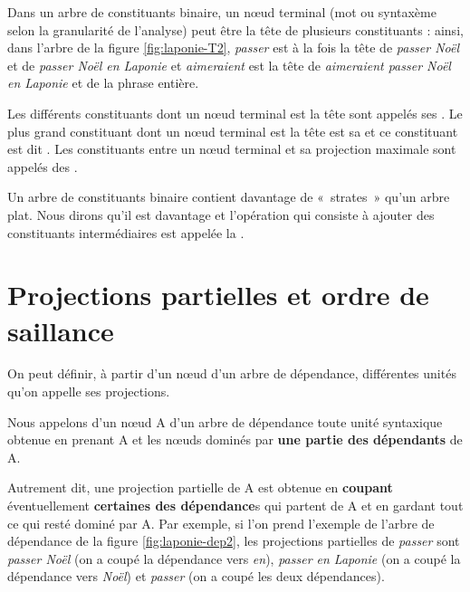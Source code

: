 Dans un arbre de constituants binaire, un nœud terminal (mot ou syntaxème selon la granularité de l’analyse) peut être la tête de plusieurs constituants : ainsi, dans l'arbre de la figure \ref{fig:laponie-T2}, \textit{passer} est à la fois la tête de \textit{passer Noël} et de \textit{passer Noël en Laponie} et \textit{aimeraient} est la tête de \textit{aimeraient passer Noël en Laponie} et de la phrase entière. 

{Les différents constituants dont un nœud terminal est la tête sont appelés ses . Le plus grand constituant dont un nœud terminal est la tête est sa  et ce constituant est dit . Les constituants entre un nœud terminal et sa projection maximale sont appelés des .}

{Un arbre de constituants binaire contient davantage de «~strates~» qu’un arbre plat. Nous dirons qu’il est davantage  et l’opération qui consiste à ajouter des constituants intermédiaires est appelée la .}

\section{Projections partielles et ordre de saillance}\label{sec:3.4.15}

On peut définir, à partir d'un nœud d'un arbre de dépendance, différentes unités qu'on appelle ses projections. 

{Nous appelons  d’un nœud A d'un arbre de dépendance toute unité syntaxique obtenue en prenant A et les nœuds dominés par \textbf{une partie des dépendants} de A.}

Autrement dit, une projection partielle de A est obtenue en \textbf{coupant} éventuellement \textbf{certaines des dépendance}s qui partent de A et en gardant tout ce qui resté dominé par A. Par exemple, si l'on prend l'exemple de l'arbre de dépendance de la figure \ref{fig:laponie-dep2}, les projections partielles de \textit{passer} sont \textit{passer Noël} (on a coupé la dépendance vers \textit{en}), \textit{passer en Laponie} (on a coupé la dépendance vers \textit{Noël}) et \textit{passer} (on a coupé les deux dépendances).

